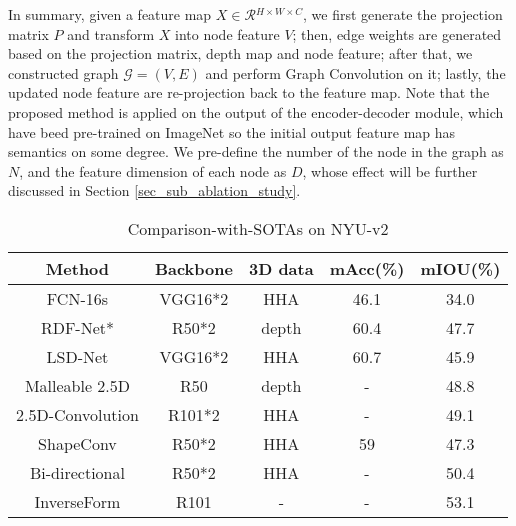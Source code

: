 ﻿\documentclass[journal]{IEEEtran}
\begin{document}
        In summary, given a feature map ${X} \in \mathcal{R}{^{H\times W\times C}}$, we first generate the projection matrix ${P}$ and transform $X$ into node feature $V$; then, edge weights are generated based on the projection matrix, depth map and node feature; after that, we constructed graph  $\mathcal{G}=(V, E)$ and perform Graph Convolution on it; lastly, the updated node feature are re-projection back to the feature map. Note that the proposed method is applied on the output of the encoder-decoder module, which have beed pre-trained on ImageNet so the initial output feature map has semantics on some degree. We pre-define the number of the node in the graph as $N$, and the feature dimension of each node as $D$, whose effect will be further discussed in Section \ref{sec_sub_ablation_study}.  


    \begin{table}
        \caption{Comparison-with-SOTAs on NYU-v2}\label{table_nyu_sota}
        \centering
        \begin{tabular}{c|c|c|c|c}
            \hline
            Method & Backbone & 3D data & mAcc(\%) & mIOU(\%) \\
            \hline
            FCN-16s\cite{long2015fully}  & VGG16*2 & HHA & 46.1 & 34.0 \\
    
            RDF-Net* \cite{park2017rdfnet} & R50*2 & depth & 60.4 & 47.7 \\
    
            LSD-Net \cite{cheng2017locality} & VGG16*2 & HHA & 60.7 & 45.9 \\    
    
            Malleable 2.5D \cite{2020malleable} & R50 & depth & - &  48.8 \\    
    
            2.5D-Convolution \cite{xing201925DConv} & R101*2 & HHA & - &  49.1 \\    
            
            ShapeConv \cite{2021shapeconv} &  R50*2  &  HHA & 59 & 47.3 \\    
    
            Bi-directional \cite{chen2020bi} &  R50*2  & HHA &  - & 50.4 \\    
     
    
            InverseForm \cite{borse2021inverseform}&  R101  & - &  - & 53.1 \\    
    

\end{tabular}
\end{table}
\end{document}

